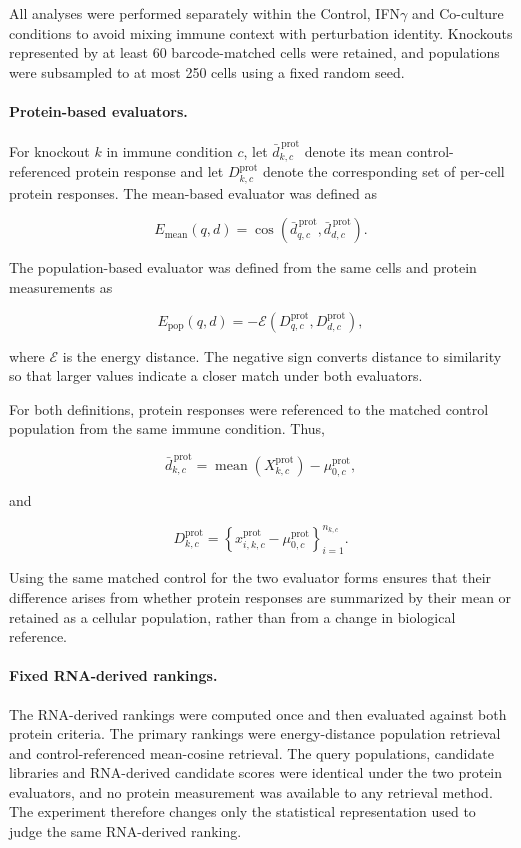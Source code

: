 \documentclass[11pt,letterpaper]{article}
\begin{document}
All analyses were performed separately within the Control, IFN$\gamma$ and Co-culture conditions
to avoid mixing immune context with perturbation identity. Knockouts represented by at least
60 barcode-matched cells were retained, and populations were subsampled to at most 250 cells
using a fixed random seed.

\paragraph{Protein-based evaluators.}
For knockout $k$ in immune condition $c$, let
$\bar d^{\,\mathrm{prot}}_{k,c}$ denote its mean control-referenced protein response and let
$D^{\mathrm{prot}}_{k,c}$ denote the corresponding set of per-cell protein responses. The
mean-based evaluator was defined as

$$
E_{\mathrm{mean}}(q,d)
=
\cos
\left(
\bar d^{\,\mathrm{prot}}_{q,c},
\bar d^{\,\mathrm{prot}}_{d,c}
\right).
$$

The population-based evaluator was defined from the same cells and protein measurements as

$$
E_{\mathrm{pop}}(q,d)
=
-
\mathcal{E}
\left(
D^{\mathrm{prot}}_{q,c},
D^{\mathrm{prot}}_{d,c}
\right),
$$

where $\mathcal{E}$ is the energy distance. The negative sign converts distance to similarity
so that larger values indicate a closer match under both evaluators.

For both definitions, protein responses were referenced to the matched control population from
the same immune condition. Thus,

$$
\bar d^{\,\mathrm{prot}}_{k,c}
=
\operatorname{mean}
\left(
X^{\mathrm{prot}}_{k,c}
\right)
-
\mu^{\mathrm{prot}}_{0,c},
$$

and

$$
D^{\mathrm{prot}}_{k,c}
=
\left\{
x^{\mathrm{prot}}_{i,k,c}
-
\mu^{\mathrm{prot}}_{0,c}
\right\}_{i=1}^{n_{k,c}}.
$$

Using the same matched control for the two evaluator forms ensures that their difference arises
from whether protein responses are summarized by their mean or retained as a cellular population,
rather than from a change in biological reference.

\paragraph{Fixed RNA-derived rankings.}
The RNA-derived rankings were computed once and then evaluated against both protein criteria.
The primary rankings were energy-distance population retrieval and control-referenced
mean-cosine retrieval. The query populations, candidate libraries and RNA-derived candidate
scores were identical under the two protein evaluators, and no protein measurement was available
to any retrieval method. The experiment therefore changes only the statistical representation
used to judge the same RNA-derived ranking.
\end{document}
